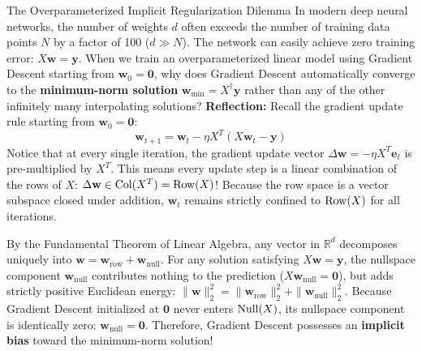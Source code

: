 \begin{ponderbox}{The Overparameterized Implicit Regularization Dilemma}
In modern deep neural networks, the number of weights $d$ often exceeds the number of training data points $N$ by a factor of 100 ($d \gg N$). The network can easily achieve zero training error: $X\mathbf{w} = \mathbf{y}$.
When we train an overparameterized linear model using Gradient Descent starting from $\mathbf{w}_0 = \mathbf{0}$, why does Gradient Descent automatically converge to the \textbf{minimum-norm solution} $\mathbf{w}_{\text{min}} = X^\dagger \mathbf{y}$ rather than any of the other infinitely many interpolating solutions?
\tcblower
\textbf{Reflection:}
Recall the gradient update rule starting from $\mathbf{w}_0 = \mathbf{0}$:
\begin{equation*}
\mathbf{w}_{t+1} = \mathbf{w}_t - \eta X^T (X\mathbf{w}_t - \mathbf{y})
\end{equation*}
Notice that at every single iteration, the gradient update vector $\Delta \mathbf{w} = -\eta X^T \mathbf{e}_t$ is pre-multiplied by $X^T$.
This means every update step is a linear combination of the rows of $X$: $\Delta \mathbf{w} \in \operatorname{Col}(X^T) = \operatorname{Row}(X)$!
Because the row space is a vector subspace closed under addition, $\mathbf{w}_t$ remains strictly confined to $\operatorname{Row}(X)$ for all iterations.

By the Fundamental Theorem of Linear Algebra, any vector in $\mathbb{R}^d$ decomposes uniquely into $\mathbf{w} = \mathbf{w}_{\text{row}} + \mathbf{w}_{\text{null}}$.
For any solution satisfying $X\mathbf{w} = \mathbf{y}$, the nullspace component $\mathbf{w}_{\text{null}}$ contributes nothing to the prediction ($X\mathbf{w}_{\text{null}} = \mathbf{0}$), but adds strictly positive Euclidean energy: $\|\mathbf{w}\|_2^2 = \|\mathbf{w}_{\text{row}}\|_2^2 + \|\mathbf{w}_{\text{null}}\|_2^2$.
Because Gradient Descent initialized at $\mathbf{0}$ never enters $\operatorname{Null}(X)$, its nullspace component is identically zero: $\mathbf{w}_{\text{null}} = \mathbf{0}$.
Therefore, Gradient Descent possesses an \textbf{implicit bias} toward the minimum-norm solution!
\end{ponderbox}


